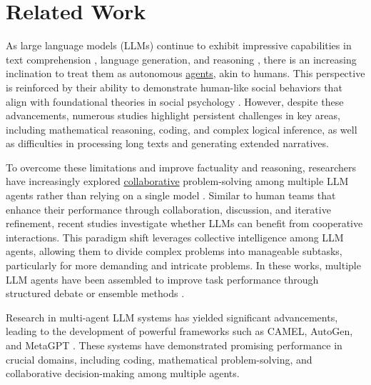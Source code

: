 \section{Related Work}\label{app:related}

As large language models (LLMs) continue to exhibit impressive capabilities in text comprehension \cite{llm-in-edu}, language generation, and reasoning \cite{reasoning-llm}, there is an increasing inclination to treat them as autonomous \underline{agents}, akin to humans. This perspective is reinforced by their ability to demonstrate human-like social behaviors that align with foundational theories in social psychology \cite{llm-human-agent}. However, despite these advancements, numerous studies \cite{llm-in-edu, long-text-qa, survey-llm-shortcomings, CoA} highlight persistent challenges in key areas, including mathematical reasoning, coding, and complex logical inference, as well as difficulties in processing long texts and generating extended narratives.


To overcome these limitations and improve factuality and reasoning, researchers have increasingly explored \underline{collaborative} problem-solving among multiple LLM agents rather than relying on a single model \cite{long-text-qa, survey-llm-shortcomings, MALLM-survey, MALLM-survey-2}. Similar to human teams that enhance their performance through collaboration, discussion, and iterative refinement, recent studies investigate whether LLMs can benefit from cooperative interactions. This paradigm shift leverages collective intelligence among LLM agents, allowing them to divide complex problems into manageable subtasks, particularly for more demanding and intricate problems. In these works, multiple LLM agents have been assembled to improve task performance through structured debate \cite{MA-LLM-debate, improving-fact-llm, div-think-llms} or ensemble methods \cite{more-agents}. 


Research in multi-agent LLM systems has yielded significant advancements, leading to the development of powerful frameworks such as CAMEL, AutoGen, and MetaGPT \cite{autogen, metagpt, camel}. These systems have demonstrated promising performance in crucial domains, including coding, mathematical problem-solving, and collaborative decision-making among multiple agents.


